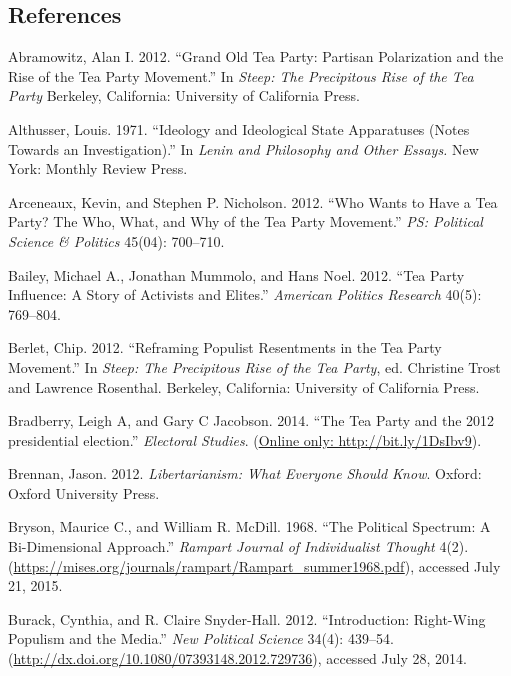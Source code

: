 \documentclass[12pt,]{article}
\begin{document}
\clearpage

\subsection{References}\label{references}

\setlength{\parindent}{-0.2in} \setlength{\leftskip}{0.2in}
\setlength{\parskip}{8pt} \vspace*{-0.2in} \noindent

Abramowitz, Alan I. 2012. ``Grand Old Tea Party: Partisan Polarization
and the Rise of the Tea Party Movement.'' In \emph{Steep: The
Precipitous Rise of the Tea Party} Berkeley, California: University of
California Press.

Althusser, Louis. 1971. ``Ideology and Ideological State Apparatuses
(Notes Towards an Investigation).'' In \emph{Lenin and Philosophy and
Other Essays.} New York: Monthly Review Press.

Arceneaux, Kevin, and Stephen P. Nicholson. 2012. ``Who Wants to Have a
Tea Party? The Who, What, and Why of the Tea Party Movement.'' \emph{PS:
Political Science \& Politics} 45(04): 700--710.

Bailey, Michael A., Jonathan Mummolo, and Hans Noel. 2012. ``Tea Party
Influence: A Story of Activists and Elites.'' \emph{American Politics
Research} 40(5): 769--804.

Berlet, Chip. 2012. ``Reframing Populist Resentments in the Tea Party
Movement.'' In \emph{Steep: The Precipitous Rise of the Tea Party}, ed.
Christine Trost and Lawrence Rosenthal. Berkeley, California: University
of California Press.

Bradberry, Leigh A, and Gary C Jacobson. 2014. ``The Tea Party and the
2012 presidential election.'' \emph{Electoral Studies}.
(\href{Online only: http://bit.ly/1DsIbv9}{Online only: http://bit.ly/1DsIbv9}).

Brennan, Jason. 2012. \emph{Libertarianism: What Everyone Should Know}.
Oxford: Oxford University Press.

Bryson, Maurice C., and William R. McDill. 1968. ``The Political
Spectrum: A Bi-Dimensional Approach.'' \emph{Rampart Journal of
Individualist Thought} 4(2).
(\url{https://mises.org/journals/rampart/Rampart_summer1968.pdf}),
accessed July 21, 2015.

Burack, Cynthia, and R. Claire Snyder-Hall. 2012. ``Introduction:
Right-Wing Populism and the Media.'' \emph{New Political Science} 34(4):
439--54. (\url{http://dx.doi.org/10.1080/07393148.2012.729736}),
accessed July 28, 2014.
\end{document}
